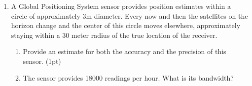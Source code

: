 \documentclass[letter,twoside,11pt]{article}
\begin{document}
\begin{enumerate}
\item A Global Positioning System sensor provides position estimates within a circle of approximately 3m diameter. Every now and then the satellites on the horizon change and the center of this circle moves elsewhere, approximately staying within a 30 meter radius of the true location of the receiver.
\begin{enumerate}
\item Provide an estimate for both the accuracy and the precision of this sensor. (1pt)
\item The sensor provides 18000 readings per hour. What is its bandwidth?
\end{enumerate}

\end{enumerate}





\end{document}
